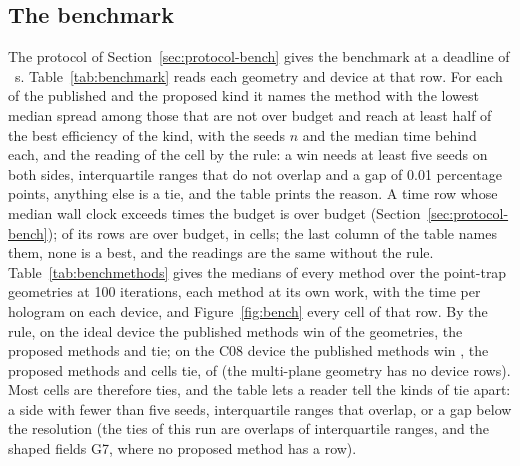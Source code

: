 \subsection{The benchmark}\label{sec:results-bench}

The protocol of Section~\ref{sec:protocol-bench} gives the benchmark at a deadline of \dlReadS{}~s. Table~\ref{tab:benchmark} reads each geometry and device at that row. For each of the published and the proposed kind it names the method with the lowest median spread among those that are not over budget and reach at least half of the best efficiency of the kind, with the seeds $n$ and the median time behind each, and the reading of the cell by the rule: a win needs at least five seeds on both sides, interquartile ranges that do not overlap and a gap of 0.01 percentage points, anything else is a tie, and the table prints the reason. A time row whose median wall clock exceeds \dlFactor{} times the budget is over budget (Section~\ref{sec:protocol-bench}); \dlOverRead{} of its \dlRowsRead{} rows are over budget, in \dlCellsOver{} cells; the last column of the table names them, none is a best, and the readings are the same without the rule. Table~\ref{tab:benchmethods} gives the medians of every method over the \benchNPoint{} point-trap geometries at 100 iterations, each method at its own work, with the time per hologram on each device, and Figure~\ref{fig:bench} every cell of that row. By the rule, on the ideal device the published methods win \benchWinsIdealPublished{} of the \benchGeoIdeal{} geometries, the proposed methods \benchWinsIdealProposed{} and \benchTiesIdeal{} tie; on the C08 device the published methods win \benchWinsDevicePublished{}, the proposed methods \benchWinsDeviceProposed{} and \benchTiesDevice{} cells tie, of \benchGeoDevice{} (the multi-plane geometry has no device rows). Most cells are therefore ties, and the table lets a reader tell the kinds of tie apart: a side with fewer than five seeds, interquartile ranges that overlap, or a gap below the resolution (the ties of this run are overlaps of interquartile ranges, and the shaped fields G7, where no proposed method has a row).

